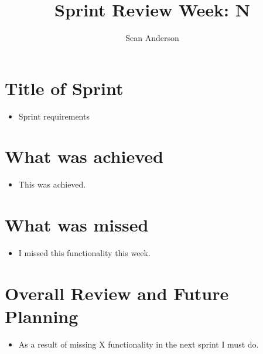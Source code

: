 \documentclass[a4paper, 12pt]{article}
\title{Sprint Review Week: N}
\date{}
\author{Sean Anderson}
\begin{document}
\maketitle
\section{Title of Sprint}
\begin{itemize}
	\item Sprint requirements
\end{itemize}
\section{What was achieved}
\begin{itemize}
	\item This was achieved.
\end {itemize}
\section{What was missed}
\begin{itemize}
	\item I missed this functionality this week.
\end{itemize}
\section{Overall Review and Future Planning}
\begin{itemize}
	\item As a result of missing X functionality in the next sprint I must do.
\end{itemize}
\end{document}
